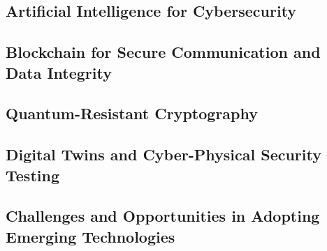 \subsection{Artificial Intelligence for Cybersecurity}\label{subsec:artificial-intelligence-for-cybersecurity-in-avs}
\subsection{Blockchain for Secure Communication and Data Integrity}\label{subsec:blockchain-for-secure-communication-and-data-integrity}
\subsection{Quantum-Resistant Cryptography}\label{subsec:quantum-resistant-cryptography-in-future-avs}
\subsection{Digital Twins and Cyber-Physical Security Testing}\label{subsec:digital-twins-and-cyber-physical-security-testing}
\subsection{Challenges and Opportunities in Adopting Emerging Technologies}\label{subsec:challenges-and-opportunities-in-adopting-emerging-technologies}

